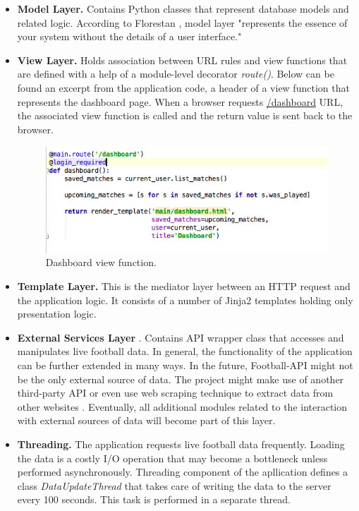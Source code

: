 \begin{itemize}
    \item \textbf{Model Layer.} Contains Python classes that represent database models and related logic. According to Florestan \cite{article:goodArchitecture}, model layer "represents the essence of your system without the details of a user interface."
    \item \textbf{View Layer.} Holds association between URL rules and view functions that are defined with a help of a module-level decorator \emph{route()}. Below can be found an excerpt from the application code, a header of a view function that represents the dashboard page. When a browser requests \url{/dashboard} URL, the associated view function is called and the return value is sent back to the browser. 

\begin{figure}[H]
    \begin{center}
        \includegraphics[width=.70\linewidth]{impl/images/routeExample}
        \caption{Dashboard view function.} \label{fig:using:routeexample}
    \end{center}
\end{figure}     
        
    \item \textbf{Template Layer.} This is the mediator layer between an HTTP request and the application logic. It consists of a number of Jinja2 templates holding only     presentation logic. 
    \item \textbf{External Services Layer} \cite{article:goodArchitecture}. Contains API wrapper class that accesses and manipulates live football data. In general, the functionality of the application can be further extended in many ways. In the future, Football-API might not be the only external source of data. The project might make use of another third-party API or even use web scraping technique to extract data from other websites . Eventually, all additional modules related to the interaction with external sources of data will become part of this layer.
    \item \textbf{Threading.} The application requests live football data frequently. Loading the data is a costly I/O operation that may become a bottleneck unless performed asynchronously. Threading component of the apllication defines a class \emph{DataUpdateThread} that takes care of writing the data to the server every 100 seconds. This task is performed in a separate thread. 
\end{itemize}

